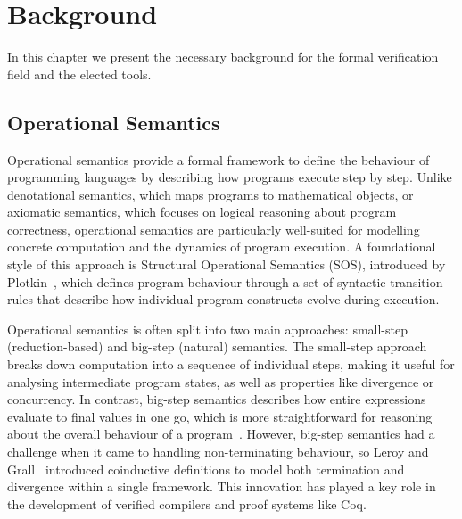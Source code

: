 
%


\chapter{Background}
\label{cha:Background}

In this chapter we present the necessary background for the formal verification field and the elected tools.

\section{Operational Semantics}
\label{sec:Operational_Semantics}

Operational semantics provide a formal framework to define the behaviour of programming languages by describing 
how programs execute step by step. Unlike denotational semantics, which maps programs to mathematical objects, or 
axiomatic semantics, which focuses on logical reasoning about program correctness, operational semantics are particularly 
well-suited for modelling concrete computation and the dynamics of program execution. A foundational style of 
this approach is Structural Operational Semantics (SOS), introduced by Plotkin~\cite{plotkin_81_structural}, which defines program behaviour 
through a set of syntactic transition rules that describe how individual program constructs evolve during execution.

Operational semantics is often split into two main approaches: small-step (reduction-based) and big-step (natural) semantics. 
The small-step approach breaks down computation into a sequence of individual steps, making it useful for analysing intermediate 
program states, as well as properties like divergence or concurrency. In contrast, big-step semantics describes how entire expressions 
evaluate to final values in one go, which is more straightforward for reasoning about the overall behaviour of a 
program~\cite{abs-0808-0586}. However, big-step semantics had a challenge when it came to handling non-terminating behaviour, so 
Leroy and Grall~\cite{abs-0808-0586} introduced coinductive definitions to model both termination and divergence within a single framework. 
This innovation has played a key role in the development of verified compilers and proof systems like Coq.

